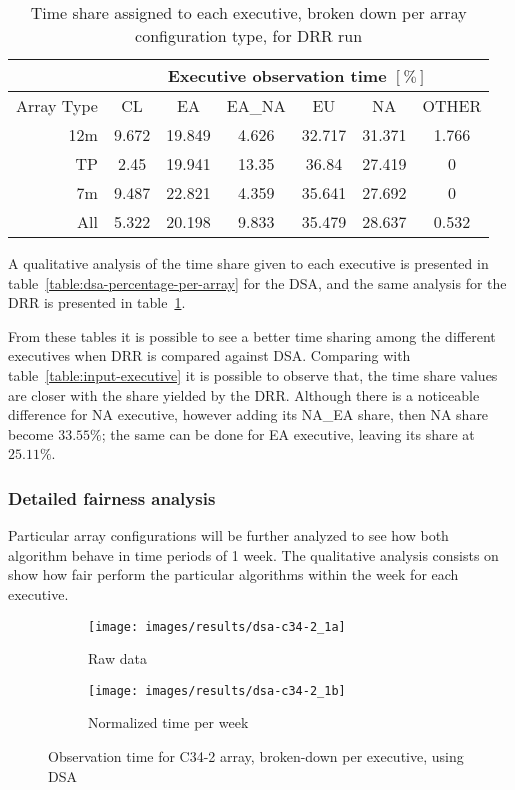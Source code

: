 \begin{table}[t]
\centering
\begin{tabular}{c|c|c|c|c|c|c|} 
\cline{2-7}
 & \multicolumn{6}{c|}{Executive observation time $[\%]$} \\ \hline
\multicolumn{1}{|r|}{Array Type} & CL	& EA & EA\_NA &	EU & NA & OTHER \\ \hline
\multicolumn{1}{|r|}{12m} & 9.672 & 19.849 & 4.626 & 32.717 & 31.371 & 1.766 \\ \hline
\multicolumn{1}{|r|}{TP} & 2.45 & 19.941 & 13.35 & 36.84 & 27.419 & 0 \\ \hline
\multicolumn{1}{|r|}{7m} & 9.487 & 22.821 & 4.359 & 35.641 & 27.692 & 0 \\ \hline
\multicolumn{1}{|r|}{All} & 5.322 & 20.198 & 9.833 & 35.479 & 28.637 & 0.532 \\ \hline
\end{tabular}
\caption{Time share assigned to each executive, broken down per array configuration type, for DRR run}
\label{table:drr-percentage-per-array}
\end{table}

A qualitative analysis of the time share given to each executive is presented in table~\ref{table:dsa-percentage-per-array} for the DSA, and the same analysis for the DRR is presented in table~\ref{table:drr-percentage-per-array}. 

From these tables it is possible to see a better time sharing among the different executives when DRR is compared against DSA. Comparing with table~\ref{table:input-executive} it is possible to observe that, the time share values are closer with the share yielded by the DRR. Although there is a noticeable difference for NA executive, however adding its NA\_EA share, then NA share become $33.55\%$; the same can be done for EA executive, leaving its share at $25.11\%$.

\subsubsection{Detailed fairness analysis}
Particular array configurations will be further analyzed to see how both algorithm behave in time periods of 1 week. The qualitative analysis consists on show how fair perform the particular algorithms within the week for each executive.

\begin{figure}[t]
\centering
	\begin{subfigure}[b]{0.49\textwidth}
		\texttt{[image: images/results/dsa-c34-2\_1a]}
        \caption{Raw data} 
    \end{subfigure} 
    \begin{subfigure}[b]{0.49\textwidth}
    		\texttt{[image: images/results/dsa-c34-2\_1b]}
            \caption{Normalized time per week} 
    \end{subfigure}
    \caption{Observation time for C34-2 array, broken-down per executive, using DSA}
    \label{fig:dsa-c34-2-exec}
\end{figure}

